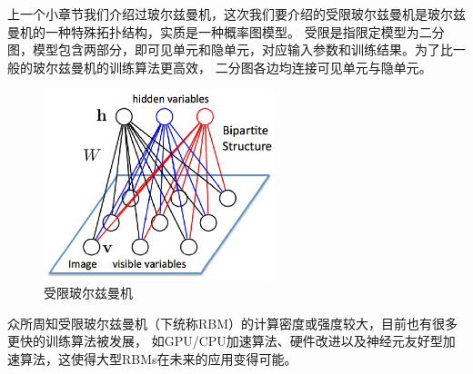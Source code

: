 \documentclass[12pt,a4paper,UTF8]{ctexart}
\begin{document}
上一个小章节我们介绍过玻尔兹曼机，这次我们要介绍的受限玻尔兹曼机是玻尔兹曼机的一种特殊拓扑结构，实质是一种概率图模型。
受限是指限定模型为二分图，模型包含两部分，即可见单元和隐单元，对应输入参数和训练结果。为了比一般的玻尔兹曼机的训练算法更高效，
二分图各边均连接可见单元与隐单元。
\begin{figure}[htpb]
    \centering
    \includegraphics[width=0.6\textwidth]{allpicture/f5dt7-uxdal.eps}
    \caption{受限玻尔兹曼机}
    \label{fig:受限玻尔兹曼机}
\end{figure}
众所周知受限玻尔兹曼机（下统称RBM）的计算密度或强度较大，目前也有很多更快的训练算法被发展，
如GPU/CPU加速算法、硬件改进以及神经元友好型加速算法，这使得大型RBMs在未来的应用变得可能。
\end{document}
